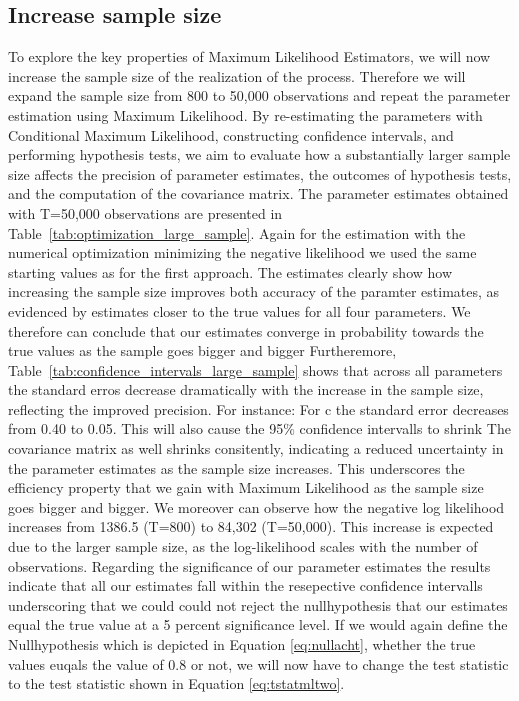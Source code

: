 \documentclass[12pt]{article}
\begin{document}
\subsection{Increase sample size}
To explore the key properties of Maximum Likelihood Estimators, we will now increase the sample size of the realization of the process. 
Therefore we will expand the sample size from 800 to 50,000 observations and repeat the parameter estimation using Maximum Likelihood. By re-estimating the parameters with Conditional Maximum Likelihood, constructing confidence intervals, and performing hypothesis tests, we aim to evaluate how a substantially larger sample size affects the precision of parameter estimates, the outcomes of hypothesis tests, and the computation of the covariance matrix.
The parameter estimates obtained with T=50,000 observations are presented in Table~\ref{tab:optimization_large_sample}. Again for the estimation with the numerical optimization minimizing the negative likelihood we used the same starting values as for the first approach.
The estimates clearly show how increasing the sample size improves both accuracy of the paramter estimates, as evidenced by estimates closer to the true values for all four parameters.
We therefore can conclude that our estimates converge in probability towards the true values as the sample goes bigger and bigger
Furtheremore, Table~\ref{tab:confidence_intervals_large_sample} shows that across all parameters the standard erros decrease dramatically with the increase in the sample size, reflecting the improved precision.
For instance: For c the standard error decreases from 0.40 to 0.05. This will also cause the 95\% confidence intervalls to shrink
The covariance matrix as well shrinks consitently, indicating a reduced uncertainty in the parameter estimates as the sample size increases.
This underscores the efficiency property that we gain with Maximum Likelihood as the sample size goes bigger and bigger.
We moreover can observe how the negative log likelihood increases from 1386.5 (T=800) to 84,302 (T=50,000). 
This increase is expected due to the larger sample size, as the log-likelihood scales with the number of observations.
Regarding the significance of our parameter estimates the results indicate that all our estimates fall within the resepective confidence intervalls underscoring that we could could not reject the nullhypothesis that our estimates equal the true value at a 5 percent significance level.
If we would again define the Nullhypothesis which is depicted in Equation  \ref{eq:nullacht}, whether the true values euqals the value of 0.8 or not, we will now have to change the test statistic to the test statistic shown in Equation \ref{eq:tstatmltwo}.
\end{document}
